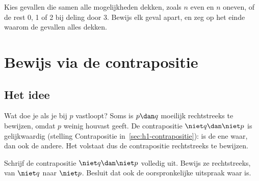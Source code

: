 \begin{werkwijze}
Kies gevallen die samen alle mogelijkheden dekken, zoals $n$ even en $n$ oneven, of de rest 0, 1 of 2 bij deling door 3. Bewijs elk geval apart, en zeg op het einde waarom de gevallen alles dekken.
\end{werkwijze}

\begin{oefeningen}
\end{oefeningen}

\section{Bewijs via de contrapositie}\label{sec:h2-contrapositie}

\subsection{Het idee}

Wat doe je als je bij $p$ vastloopt? Soms is $p \dan q$ moeilijk rechtstreeks te bewijzen, omdat $p$ weinig houvast geeft. De contrapositie $\niet q \dan \niet p$ is gelijkwaardig (stelling Contrapositie in~\ref{sec:h1-contrapositie}): is de ene waar, dan ook de andere. Het volstaat dus de contrapositie rechtstreeks te bewijzen.


\begin{werkwijze}
Schrijf de contrapositie $\niet q \dan \niet p$ volledig uit. Bewijs ze rechtstreeks, van $\niet q$ naar $\niet p$. Besluit dat ook de oorspronkelijke uitspraak waar is.
\end{werkwijze}

\begin{oefeningen}

\end{oefeningen}

